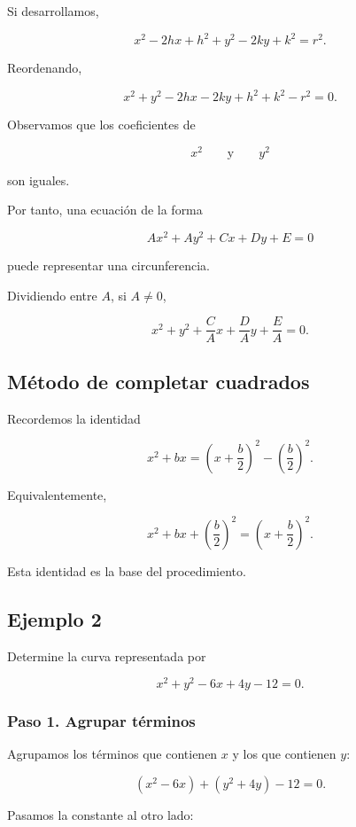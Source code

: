 \documentclass[12pt]{article}
\begin{document}
Si desarrollamos,

\[
x^2-2hx+h^2+y^2-2ky+k^2=r^2.
\]

Reordenando,

\[
x^2+y^2-2hx-2ky+h^2+k^2-r^2=0.
\]

Observamos que los coeficientes de

\[
x^2
\qquad\text{y}\qquad
y^2
\]

son iguales.

Por tanto, una ecuación de la forma

\[
Ax^2+Ay^2+Cx+Dy+E=0
\]

puede representar una circunferencia.

Dividiendo entre \(A\), si \(A\neq0\),

\[
x^2+y^2+\frac{C}{A}x+\frac{D}{A}y+\frac{E}{A}=0.
\]

\subsection*{Método de completar cuadrados}

Recordemos la identidad

\[
x^2+bx
=
\left(x+\frac{b}{2}\right)^2
-
\left(\frac{b}{2}\right)^2.
\]

Equivalentemente,

\[
x^2+bx+\left(\frac{b}{2}\right)^2
=
\left(x+\frac{b}{2}\right)^2.
\]

Esta identidad es la base del procedimiento.

\subsection*{Ejemplo 2}

Determine la curva representada por

\[
x^2+y^2-6x+4y-12=0.
\]

\subsubsection*{Paso 1. Agrupar términos}

Agrupamos los términos que contienen \(x\) y los que contienen \(y\):

\[
(x^2-6x)+(y^2+4y)-12=0.
\]

Pasamos la constante al otro lado:
\end{document}
